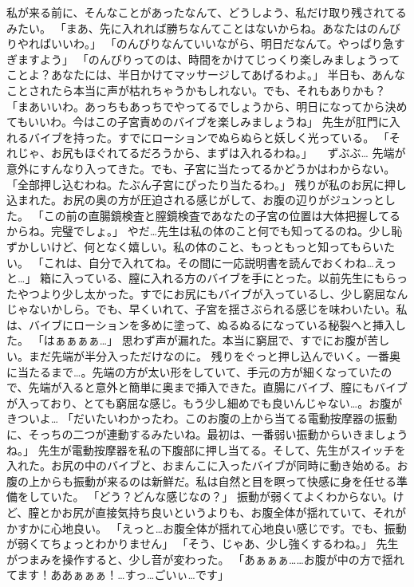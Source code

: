 私が来る前に、そんなことがあったなんて、どうしよう、私だけ取り残されてるみたい。
「まあ、先に入れれば勝ちなんてことはないからね。あなたはのんびりやればいいわ。」
「のんびりなんていいながら、明日だなんて。やっぱり急すぎますよう」
「のんびりってのは、時間をかけてじっくり楽しみましょうってことよ？あなたには、半日かけてマッサージしてあげるわよ。」
半日も、あんなことされたら本当に声が枯れちゃうかもしれない。でも、それもありかも？
「まあいいわ。あっちもあっちでやってるでしょうから、明日になってから決めてもいいわ。今はこの子宮責めのバイブを楽しみましょうね」
先生が肛門に入れるバイブを持った。すでにローションでぬらぬらと妖しく光っている。
「それじゃ、お尻もほぐれてるだろうから、まずは入れるわね。」
　ずぶぶ…
先端が意外にすんなり入ってきた。でも、子宮に当たってるかどうかはわからない。
「全部押し込むわね。たぶん子宮にぴったり当たるわ。」
残りが私のお尻に押し込まれた。お尻の奥の方が圧迫される感じがして、お腹の辺りがジュンっとした。
「この前の直腸鏡検査と膣鏡検査であなたの子宮の位置は大体把握してるからね。完璧でしょ。」
やだ…先生は私の体のこと何でも知ってるのね。少し恥ずかしいけど、何となく嬉しい。私の体のこと、もっともっと知ってもらいたい。
「これは、自分で入れてね。その間に一応説明書を読んでおくわね…えっと…」
箱に入っている、膣に入れる方のバイブを手にとった。以前先生にもらったやつより少し太かった。すでにお尻にもバイブが入っているし、少し窮屈なんじゃないかしら。でも、早くいれて、子宮を揺さぶられる感じを味わいたい。私は、バイブにローションを多めに塗って、ぬるぬるになっている秘裂へと挿入した。
「はぁぁぁぁ…」
思わず声が漏れた。本当に窮屈で、すでにお腹が苦しい。まだ先端が半分入っただけなのに。
残りをぐっと押し込んでいく。一番奥に当たるまで…。先端の方が太い形をしていて、手元の方が細くなっていたので、先端が入ると意外と簡単に奥まで挿入できた。直腸にバイブ、膣にもバイブが入っており、とても窮屈な感じ。もう少し細めでも良いんじゃない…。お腹がきついよ…
「だいたいわかったわ。このお腹の上から当てる電動按摩器の振動に、そっちの二つが連動するみたいね。最初は、一番弱い振動からいきましょうね。」
先生が電動按摩器を私の下腹部に押し当てる。そして、先生がスイッチを入れた。お尻の中のバイブと、おまんこに入ったバイブが同時に動き始める。お腹の上からも振動が来るのは新鮮だ。私は自然と目を瞑って快感に身を任せる準備をしていた。
「どう？どんな感じなの？」
振動が弱くてよくわからない。けど、膣とかお尻が直接気持ち良いというよりも、お腹全体が揺れていて、それがかすかに心地良い。
「えっと…お腹全体が揺れて心地良い感じです。でも、振動が弱くてちょっとわかりません」
「そう、じゃあ、少し強くするわね。」
先生がつまみを操作すると、少し音が変わった。
「あぁぁぁ……お腹が中の方で揺れてます！ああぁぁぁ！…すっ…ごいぃ…です」
